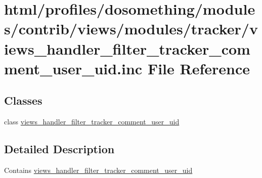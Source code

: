 \hypertarget{views__handler__filter__tracker__comment__user__uid_8inc}{
\section{html/profiles/dosomething/modules/contrib/views/modules/tracker/views\_\-handler\_\-filter\_\-tracker\_\-comment\_\-user\_\-uid.inc File Reference}
\label{views__handler__filter__tracker__comment__user__uid_8inc}
}
\subsection*{Classes}
\begin{DoxyCompactItemize}
\item 
class \hyperlink{classviews__handler__filter__tracker__comment__user__uid}{views\_\-handler\_\-filter\_\-tracker\_\-comment\_\-user\_\-uid}
\end{DoxyCompactItemize}


\subsection{Detailed Description}
Contains \hyperlink{classviews__handler__filter__tracker__comment__user__uid}{views\_\-handler\_\-filter\_\-tracker\_\-comment\_\-user\_\-uid} 